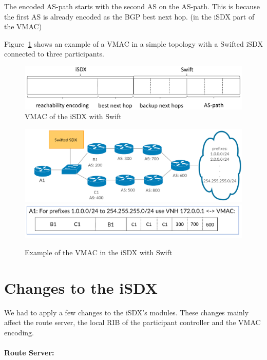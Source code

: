 The encoded AS-path starts with the second AS on the AS-path. This is because the first AS is already encoded as the BGP best next hop. (in the iSDX part of the VMAC) 

Figure~\ref{fig:sixdsvmac} shows an example of a VMAC in a simple topology with a Swifted iSDX connected to three participants. 

\begin{figure}[h]
\center
\includegraphics[scale = 0.5]{Figures/design_vmac3_cropped.pdf}
\caption{VMAC of the iSDX with Swift}
\end{figure}

\begin{figure}[h]
\center
\includegraphics[scale = 0.24]{Figures/design_vmac_topology.pdf}
\includegraphics[scale = 0.35]{Figures/vmac_picture_cropped.pdf}
\caption{Example of the VMAC in the iSDX with Swift}
\label{fig:sixdsvmac}
\end{figure}

\section{\label{chapter4:Changes_to_the_iSDX}Changes to the iSDX}

We had to apply a few changes to the iSDX's modules. These changes mainly affect the route server, the local RIB of the participant controller and the VMAC encoding. 

\paragraph{\label{chapter4:Changes to the iSDX:route server}Route Server:}


